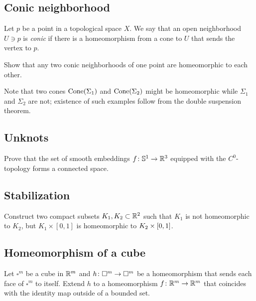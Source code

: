 \subsection*{Conic neighborhood}
\label{Conic neighborhood}

Let $p$ be a point in a topological space $X$.
We say that an open neighborhood $U\ni p$ is \emph{conic}
if there is a homeomorphism from a cone
to $U$ that sends the vertex to $p$.

\begin{pr}  
Show that any two conic neighborhoods of one point are homeomorphic to each other.
\end{pr}

Note that two cones $\mathop{\rm Cone}(\Sigma_1)$ and $\mathop{\rm Cone}(\Sigma_2)$ might be homeomorphic while $\Sigma_1$ and $\Sigma_2$ are not;
existence of such examples follow from the double suspension theorem.

\subsection*{Unknots\easy}\label{No knots}

\begin{pr}
Prove that the set of smooth embeddings $f\:\mathbb{S}^1\z\to\RR^3$ equipped with the $C^0$-topology 
forms a connected space.
\end{pr}

\subsection*{Stabilization}\label{Simple stabilization}

\begin{pr}
Construct two compact subsets $K_1, K_2\subset\mathbb{R}^2$ such that
$K_1$ is not homeomorphic to $K_2$, but $K_1\times[0,1]$ is homeomorphic to $K_2\z\times[0,1]$.
\end{pr}

\subsection*{Homeomorphism of a cube}\label{Homeomorphism of cube}

\begin{pr}
Let $\square^m$ be a cube in $\mathbb{R}^m$
and $h\:\square^m\z\to\square^m$ be
a homeomorphism that sends each face of $\square^m$ to itself.
Extend $h$ to a homeomorphism $f\colon\mathbb{R}^m\to\mathbb{R}^m$ that coincides with the identity map outside of a bounded set.    
\end{pr}

